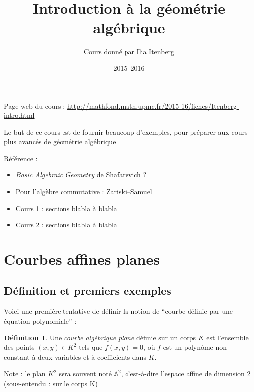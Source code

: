 \documentclass[a4paper, 11pt]{article}
\theoremstyle{definition}
\newtheorem{définition}{Définition}
\newcommand{\aff}{\mathbb{A}}
\begin{document}
\title{Introduction à la géométrie algébrique}
\author{Cours donné par Ilia Itenberg}
\date{2015--2016}

\maketitle

Page web du cours : \url{http://mathfond.math.upmc.fr/2015-16/fiches/Itenberg-intro.html}

Le but de ce cours est de fournir beaucoup d'exemples, pour préparer
aux cours plus avancés de géométrie algébrique

Référence :
\begin{itemize}
\item \textit{Basic Algebraic Geometry} de Shafarevich ?
\item Pour l'algèbre commutative : Zariski--Samuel
\end{itemize}

\begin{itemize}
\item Cours 1 : sections blabla à blabla
\item Cours 2 : sections blabla à blabla
\end{itemize}

\tableofcontents

\newpage

\section{Courbes affines planes}

\subsection{Définition et premiers exemples}

Voici une première tentative de définir la notion de \enquote{courbe
  définie par une équation polynomiale} :
\begin{définition}
  Une \emph{courbe algébrique plane} définie sur un corps $K$ est
  l'ensemble des points $(x,y) \in K^2$ tels que $f(x,y) = 0$, où $f$
  est un polynôme non constant à deux variables et à coefficients dans
  $K$.
\end{définition}
Note : le plan $K^2$ sera souvent noté $\aff^2$, c'est-à-dire l'espace
affine de dimension 2 (sous-entendu : sur le corps K)
\end{document}
